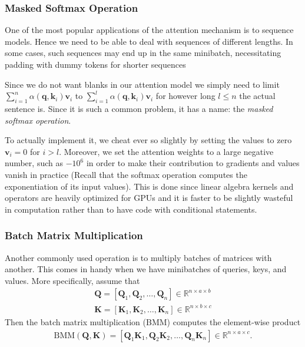 \documentclass[a4paper,12pt]{article}
\theoremstyle{definition}
\begin{document}
\subsubsection*{Masked Softmax Operation}
One of the most popular applications of the attention mechanism is to sequence models. Hence we need to be able to deal with sequences of different lengths. In some cases, 
such sequences may end up in the same minibatch, necessitating padding with dummy tokens for shorter sequences

Since we do not want blanks in our attention model we simply need to limit $\sum_{i=1}^n \alpha(\mathbf{q}, \mathbf{k}_i) \mathbf{v}_i$ to $\sum_{i=1}^l \alpha(\mathbf{q}, \mathbf{k}_i) \mathbf{v}_i$
for however long $l \leq n$ the actual sentence is. Since it is such a common problem, it has a name: the \emph{masked softmax operation}.

To actually implement it, we cheat ever so slightly by setting the values to zero $\mathbf{v}_i = 0$ for $i > l$. Moreover, we set the attention weights to a large negative number, 
such as $-10^6$ in order to make their contribution to gradients and values vanish in practice (Recall that the softmax operation computes the exponentiation of its input values).
This is done since linear algebra kernels and operators are heavily optimized for GPUs and it is faster to be slightly wasteful in computation rather than to have code with conditional statements.

\subsubsection*{Batch Matrix Multiplication}
Another commonly used operation is to multiply batches of matrices with another. This comes in handy when we have minibatches of queries, keys, and values. More specifically, assume that
\begin{equation*}
    \begin{aligned}
        \mathbf{Q} = [\mathbf{Q}_1, \mathbf{Q}_2, \ldots, \mathbf{Q}_n]  \in \mathbb{R}^{n \times a \times b} \\
        \mathbf{K} = [\mathbf{K}_1, \mathbf{K}_2, \ldots, \mathbf{K}_n]  \in \mathbb{R}^{n \times b \times c}
    \end{aligned}
\end{equation*}
Then the batch matrix multiplication (BMM) computes the element-wise product
\begin{equation*}
    \begin{aligned}
        \mathrm{BMM}(\mathbf{Q}, \mathbf{K}) = [\mathbf{Q}_1 \mathbf{K}_1, \mathbf{Q}_2 \mathbf{K}_2, \ldots, \mathbf{Q}_n \mathbf{K}_n] \in \mathbb{R}^{n \times a \times c}.
    \end{aligned}
\end{equation*}
\end{document}
